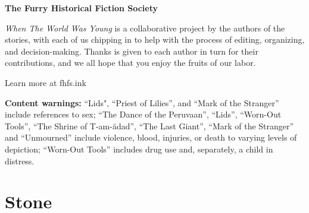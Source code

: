 \documentclass[11pt]{memoir}
\begin{document}
  \newpage

  

  \newpage
  \null
  \cleardoublepage
  \tableofcontents*
  \newpage
  \null
  \cleardoublepage

  \null
  \vfill

  \begin{center}
  \FHFS\huge \textbf{The Furry Historical Fiction Society}
  \end{center}
  
  \noindent\emph{When The World Was Young} is a collaborative project by the authors of the stories, with each of us chipping in to help with the process of editing, organizing, and decision-making. Thanks is given to each author in turn for their contributions, and we all hope that you enjoy the fruits of our labor.

  \vspace{1ex}

  \begin{center}
  \noindent Learn more at {\FHFS fhfs.ink}
  \end{center}

  \vfill

  \noindent\textbf{Content warnings:} ``Lids", ``Priest of Lilies'', and ``Mark of the Stranger'' include references to sex; ``The Dance of the Peruvaan'', ``Lids'', ``Worn-Out Tools'', ``The Shrine of T-am-ădad'', ``The Last Giant'', ``Mark of the Stranger'' and ``Unmourned'' include violence, blood, injuries, or death to varying levels of depiction; ``Worn-Out Tools'' includes drug use and, separately, a child in distress.

  \mainmatter

  \pagestyle{ourbook}

  \part*{Stone}
  \thispagestyle{empty}
	
  
  
  \storydiv
	
  
  
  \storydiv
  
  
  
	
  
  
  \storydiv
  
\end{document}
